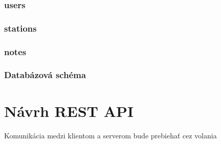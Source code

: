 \subsubsection*{users}

\subsubsection*{stations}

\subsubsection*{notes}

\subsubsection{Databázová schéma}

\section{Návrh REST API}
Komunikácia medzi klientom a serverom bude prebiehať cez volania 

